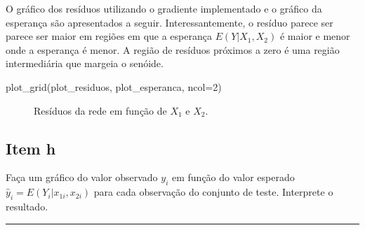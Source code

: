 \documentclass[
  a4paperpaper,
]{article}
\newenvironment{Shaded}{\begin{snugshade}}{\end{snugshade}}
\newcommand{\AttributeTok}[1]{\textcolor[rgb]{0.40,0.45,0.13}{#1}}
\newcommand{\DecValTok}[1]{\textcolor[rgb]{0.68,0.00,0.00}{#1}}
\newcommand{\FunctionTok}[1]{\textcolor[rgb]{0.28,0.35,0.67}{#1}}
\newcommand{\NormalTok}[1]{\textcolor[rgb]{0.00,0.23,0.31}{#1}}
\begin{document}
O gráfico dos resíduos utilizando o gradiente implementado e o gráfico
da esperança são apresentados a seguir. Interessantemente, o resíduo
parece ser parece ser maior em regiões em que a esperança
\(E(Y |X_1, X_2)\) é maior e menor onde a esperança é menor. A região de
resíduos próximos a zero é uma região intermediária que margeia o
senóide.

\begin{Shaded}
\begin{Highlighting}[]
\FunctionTok{plot\_grid}\NormalTok{(plot\_residuos, plot\_esperanca, }\AttributeTok{ncol=}\DecValTok{2}\NormalTok{)}
\end{Highlighting}
\end{Shaded}

\begin{figure}[H]


\caption{\label{fig-predicao-residuos}Resíduos da rede em função de
\(X_1\) e \(X_2\).}

\end{figure}%

\subsection{Item h}\label{item-h}

Faça um gráfico do valor observado \(y_i\) em função do valor esperado
\(\hat{y}_i = E(Y_i |x_{1i} , x_{2i})\) para cada observação do conjunto
de teste. Interprete o resultado.

\begin{center}\rule{0.5\linewidth}{0.5pt}\end{center}
\end{document}
